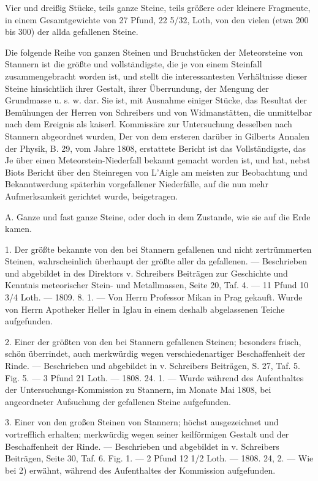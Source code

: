\documentclass[a4paper, 11pt, oneside, polutonikogreek, german]{article}
\begin{document}
Vier und dreißig Stücke, teils ganze Steine, teils größere oder kleinere Fragmeute, in einem Gesamtgewichte von 27 Pfund, 22 5/32, Loth, von den vielen (etwa 200 bis 300) der allda gefallenen Steine.

Die folgende Reihe von ganzen Steinen und Bruchstücken der Meteorsteine von Stannern ist die größte und vollständigste, die je von einem Steinfall zusammengebracht worden ist, und stellt die interessantesten Verhältnisse dieser Steine hinsichtlich ihrer Gestalt, ihrer Überrundung, der Mengung der Grundmasse u. s. w. dar. Sie ist, mit Ausnahme einiger Stücke, das Resultat der Bemühungen der Herren von Schreibers und von Widmanstätten, die unmittelbar nach dem Ereignis als kaiserl. Kommissäre zur Untersuchung desselben nach Stannern abgeordnet wurden, Der von dem ersteren darüber in Gilberts Annalen der Physik, B. 29, vom Jahre 1808, erstattete Bericht ist das Vollständigste, das Je über einen Meteorstein-Niederfall bekannt gemacht worden ist, und hat, nebst Biots Bericht über den Steinregen von L’Aigle am meisten zur Beobachtung und Bekanntwerdung späterhin vorgefallener Niederfälle, auf die nun mehr Aufmerksamkeit gerichtet wurde, beigetragen.

A. Ganze und fast ganze Steine, oder doch in dem Zustande, wie sie auf die Erde kamen.

1. Der größte bekannte von den bei Stannern gefallenen und nicht zertrümmerten Steinen, wahrscheinlich überhaupt der größte aller da gefallenen. — Beschrieben und abgebildet in des Direktors v. Schreibers Beiträgen zur Geschichte und Kenntnis meteorischer Stein- und Metallmassen, Seite 20, Taf. 4. — 11 Pfund 10 3/4 Loth. — 1809. 8. 1. — Von Herrn Professor Mikan in Prag gekauft. Wurde von Herrn Apotheker Heller in Iglau in einem deshalb abgelassenen Teiche aufgefunden.

2. Einer der größten von den bei Stannern gefallenen Steinen; besonders frisch, schön überrindet, auch merkwürdig wegen verschiedenartiger Beschaffenheit der Rinde. — Beschrieben und abgebildet in v. Schreibers Beiträgen, S. 27, Taf. 5. Fig. 5. — 3 Pfund 21 Loth. — 1808. 24. 1. — Wurde während des Aufenthaltes der Untersuchungs-Kommission zu Stannern, im Monate Mai 1808, bei angeordneter Aufsuchung der gefallenen Steine aufgefunden.

3. Einer von den großen Steinen von Stannern; höchst ausgezeichnet und vortrefflich erhalten; merkwürdig wegen seiner keilförmigen Gestalt und der Beschaffenheit der Rinde. — Beschrieben und abgebildet in v. Schreibers Beiträgen, Seite 30, Taf. 6. Fig. 1. — 2 Pfund 12 1/2 Loth. — 1808. 24, 2. — Wie bei 2) erwähnt, während des Aufenthaltes der Kommission aufgefunden.
\end{document}
